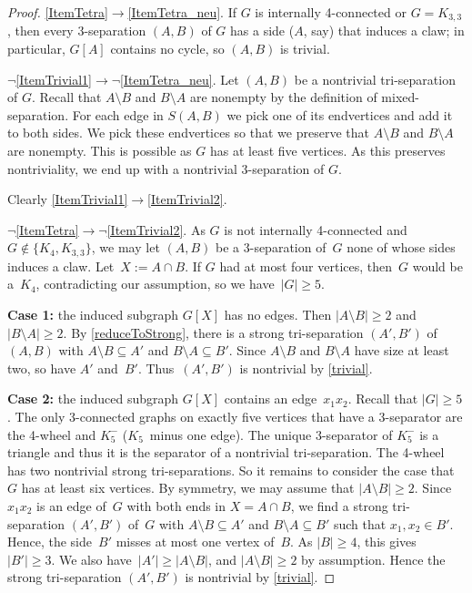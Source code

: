 \documentclass[10pt,a4paper]{amsart}
\renewcommand{\ge}{\geqslant}
\renewcommand{\geq}{\geqslant}
\newcommand{\se}{\subseteq}
\newcommand{\sm}{\setminus}
\begin{document}
\begin{proof}
\ref{ItemTetra}$\rightarrow$\ref{ItemTetra_neu}.
If $G$ is internally 4-connected or $G=K_{3,3}$, then every 3-separation $(A,B)$ of $G$ has a side ($A$, say) that induces a claw; in particular, $G[A]$ contains no cycle, so $(A,B)$ is trivial.

$\neg$\ref{ItemTrivial1}$\to\neg$\ref{ItemTetra_neu}.
Let $(A,B)$ be a nontrivial tri-separation of $G$.
Recall that $A\sm B$ and $B\sm A$ are nonempty by the definition of mixed-separation.
For each edge in $S(A,B)$ we pick one of its endvertices and add it to both sides. 
We pick these endvertices so that we preserve that $A\sm B$ and $B\sm A$ are nonempty. 
This is possible as $G$ has at least five vertices. As this preserves nontriviality, we end up with a nontrivial 3-separation of $G$. 

Clearly \ref{ItemTrivial1}$\to $\ref{ItemTrivial2}.



$\neg$\ref{ItemTetra}$\to\neg$\ref{ItemTrivial2}.
As $G$ is not internally 4-connected and $G\notin\{K_4,K_{3,3}\}$, we may let $(A,B)$ be a 3-separation of~$G$ none of whose sides induces a claw.
Let~$X:=A\cap B$.
If $G$ had at most four vertices, then~$G$ would be a~$K_4$, contradicting our assumption, so we have~$|G|\ge 5$.

{\bf Case 1:} the induced subgraph $G[X]$ has no edges.
Then $|A\sm B|\geq 2$ and~$|B\sm A|\geq 2$.
By \autoref{reduceToStrong}, there is a strong tri-separation $(A',B')$ of~$(A,B)$ with $A\sm B\se A'$ and $B\sm A\se B'$.
Since $A\sm B$ and $B\sm A$ have size at least two, so have $A'$ and~$B'$.
Thus~$(A',B')$ is nontrivial by \autoref{trivial}.

{\bf Case 2:} the induced subgraph $G[X]$ contains an edge~$x_1 x_2$.
Recall that $|G|\ge 5$.
The only 3-connected graphs on exactly five vertices that have a 3-separator are the 4-wheel and
$K_5^-$ ($K_5$~minus one edge). The unique $3$-separator of
$K_5^-$ is a triangle and thus it is the separator of a nontrivial tri-separation.
The 4-wheel has two nontrivial strong tri-separations.
So it remains to consider the
case that $G$ has at least six vertices. 
By symmetry, we may assume that $|A\sm B|\geq 2$.
Since $x_1 x_2$ is an edge of~$G$ with both ends in $X=A\cap B$, we find a strong tri-separation $(A',B')$ of~$G$ with $A\sm B\se A'$ and $B\sm A\se B'$ such that $x_1,x_2\in B'$.
Hence, the side~$B'$ misses at most one vertex of~$B$.
As $|B|\geq 4$, this gives~$|B'|\geq 3$. 
We also have~$|A'|\geq |A\sm B|$, and $|A\sm B|\ge 2$ by assumption. Hence the strong tri-separation $(A',B')$ is nontrivial by \autoref{trivial}.
\end{proof}
\end{document}
